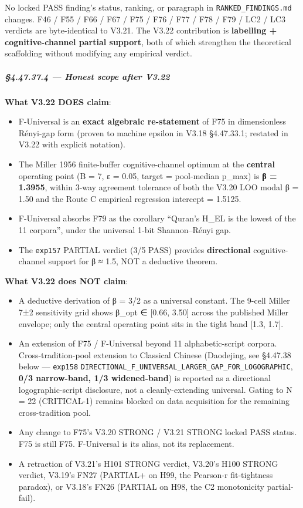 \documentclass[
]{article}
\providecommand{\tightlist}{%
  \setlength{\itemsep}{0pt}\setlength{\parskip}{0pt}}
\begin{document}
No locked PASS finding's status, ranking, or paragraph in
\texttt{RANKED\_FINDINGS.md} changes. F46 / F55 / F66 / F67 / F75 / F76
/ F77 / F78 / F79 / LC2 / LC3 verdicts are byte-identical to V3.21. The
V3.22 contribution is \textbf{labelling + cognitive-channel partial
support}, both of which strengthen the theoretical scaffolding without
modifying any empirical verdict.

\subparagraph{§4.47.37.4 --- Honest scope after
V3.22}\label{honest-scope-after-v3.22}

\textbf{What V3.22 DOES claim}:

\begin{itemize}
\tightlist
\item
  F-Universal is an \textbf{exact algebraic re-statement} of F75 in
  dimensionless Rényi-gap form (proven to machine epsilon in V3.18
  §4.47.33.1; restated in V3.22 with explicit notation).
\item
  The Miller 1956 finite-buffer cognitive-channel optimum at the
  \textbf{central} operating point (B = 7, ε = 0.05, target =
  pool-median p\_max) is \textbf{β = 1.3955}, within 3-way agreement
  tolerance of both the V3.20 LOO modal β = 1.50 and the Route C
  empirical regression intercept = 1.5125.
\item
  F-Universal absorbs F79 as the corollary ``Quran's H\_EL is the lowest
  of the 11 corpora'', under the universal 1-bit Shannon--Rényi gap.
\item
  The \texttt{exp157} PARTIAL verdict (3/5 PASS) provides
  \textbf{directional} cognitive-channel support for β ≈ 1.5, NOT a
  deductive theorem.
\end{itemize}

\textbf{What V3.22 does NOT claim}:

\begin{itemize}
\tightlist
\item
  A deductive derivation of β = 3/2 as a universal constant. The 9-cell
  Miller 7±2 sensitivity grid shows β\_opt ∈ {[}0.66, 3.50{]} across the
  published Miller envelope; only the central operating point sits in
  the tight band {[}1.3, 1.7{]}.
\item
  An extension of F75 / F-Universal beyond 11 alphabetic-script corpora.
  Cross-tradition-pool extension to Classical Chinese (Daodejing, see
  §4.47.38 below --- \texttt{exp158}
  \texttt{DIRECTIONAL\_F\_UNIVERSAL\_LARGER\_GAP\_FOR\_LOGOGRAPHIC},
  \textbf{0/3 narrow-band, 1/3 widened-band}) is reported as a
  directional logographic-script disclosure, not a cleanly-extending
  universal. Gating to N = 22 (CRITICAL-1) remains blocked on data
  acquisition for the remaining cross-tradition pool.
\item
  Any change to F75's V3.20 STRONG / V3.21 STRONG locked PASS status.
  F75 is still F75. F-Universal is its alias, not its replacement.
\item
  A retraction of V3.21's H101 STRONG verdict, V3.20's H100 STRONG
  verdict, V3.19's FN27 (PARTIAL+ on H99, the Pearson-r fit-tightness
  paradox), or V3.18's FN26 (PARTIAL on H98, the C2 monotonicity
  partial-fail).
\end{itemize}
\end{document}
